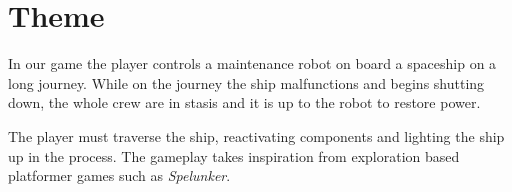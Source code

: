 \section{Theme}

In our game the player controls a maintenance robot on board a spaceship on a long journey. While on the journey the ship malfunctions and begins shutting down, the whole crew are in stasis and it is up to the robot to restore power.

The player must traverse the ship, reactivating components and lighting the ship up in the process. The gameplay takes inspiration from exploration based platformer games such as \textit{Spelunker}.